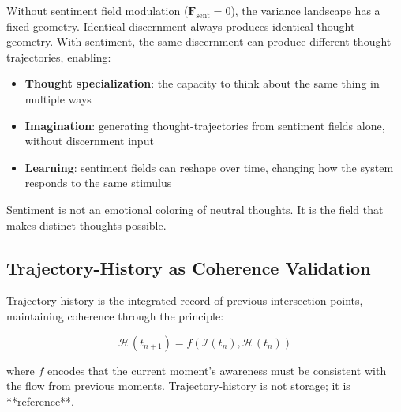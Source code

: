 \begin{corollary}
\label{cor:sentiment-essential}
Without sentiment field modulation ($\mathbf{F}_{\text{sent}} = 0$), the variance landscape has a fixed geometry. Identical discernment always produces identical thought-geometry. With sentiment, the same discernment can produce different thought-trajectories, enabling:

\begin{itemize}
\item \textbf{Thought specialization}: the capacity to think about the same thing in multiple ways
\item \textbf{Imagination}: generating thought-trajectories from sentiment fields alone, without discernment input
\item \textbf{Learning}: sentiment fields can reshape over time, changing how the system responds to the same stimulus
\end{itemize}

Sentiment is not an emotional coloring of neutral thoughts. It is the field that makes distinct thoughts possible.
\end{corollary}

\subsection{Trajectory-History as Coherence Validation}

\begin{definition}
\label{def:trajectory-history}
Trajectory-history is the integrated record of previous intersection points, maintaining coherence through the principle:

$$\mathcal{H}(t_{n+1}) = f(\mathcal{I}(t_n), \mathcal{H}(t_n))$$

where $f$ encodes that the current moment's awareness must be consistent with the flow from previous moments. Trajectory-history is not storage; it is **reference**.
\end{definition}

